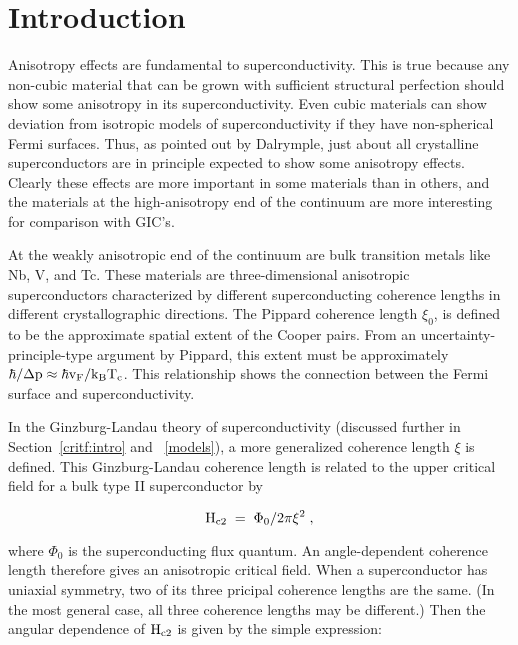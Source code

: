 \section{Introduction}
\label{otherintro}

        Anisotropy effects  are fundamental  to superconductivity.  This is
true because   any non-cubic material   that can be grown with   sufficient
structural perfection should show some anisotropy in its superconductivity.
Even  cubic   materials    can show deviation     from  isotropic models of
superconductivity if they have non-spherical Fermi surfaces.\cite{butler80}
Thus,   as  pointed out by   Dalrymple,\cite{dalrymple83}   just about  all
crystalline  superconductors  are    in   principle expected   to show some
anisotropy  effects.  Clearly   these effects are   more important in  some
materials than in others,  and the materials at the  high-anisotropy end of
the continuum are more interesting for comparison with GIC's.

        At the weakly anisotropic end of the continuum  are bulk transition
metals  like Nb,   V, and   Tc.    These  materials are   three-dimensional
anisotropic superconductors   characterized  by  different  superconducting
coherence  lengths in  different  crystallographic directions.  The Pippard
coherence length $\xi_0$, is defined  to  be the approximate spatial extent
of  the  Cooper pairs.    From  an  uncertainty-principle-type  argument by
Pippard,\cite{tinkham80} this extent must be approximately $\rm \hbar /
\Delta  p \approx \hbar  v_F  / k_B   T_c$.  This  relationship  shows  the
connection between the Fermi surface and superconductivity.

        In  the  Ginzburg-Landau theory   of  superconductivity  (discussed
further in Section~\ref{critf:intro} and ~\ref{models}), a more generalized
coherence length $\xi$ is  defined.  This Ginzburg-Landau  coherence length
is related to the upper critical field for a bulk type II superconductor by

\begin{equation}
\rm   H_{c2} \;  =   \;  \Phi_0/   2\pi \xi^2 \; ,
\label{xi_def}
\end{equation}

\noindent  where  $\Phi_0$   is   the
superconducting flux quantum.\cite{tinkham80} An angle-dependent  coherence
length      therefore gives  an  anisotropic      critical  field.  When  a
superconductor has uniaxial symmetry, two of  its  three pricipal coherence
lengths  are the   same.  (In the   most general case, all three  coherence
lengths may be different.)  Then the angular dependence  of $\rm H_{c2}$ is
given by the simple expression:\cite{kats69,morris72}

